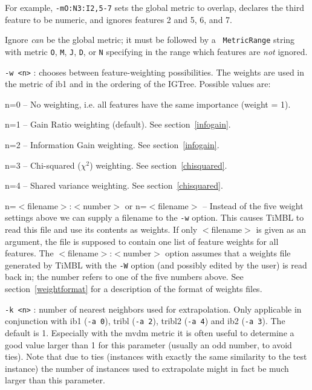 \documentclass{book}
\begin{document}
\begin{description}
For example, {\tt -mO:N3:I2,5-7} sets the global metric to overlap,
declares the third feature to be numeric, and ignores features 2 and
5, 6, and 7.

Ignore {\em can}\/ be the global metric; it must be followed by a {\tt
  MetricRange} string with metric {\tt O}, {\tt M}, {\tt J}, {\tt D},
or {\tt N} specifying in the range which features are {\em not}\/
ignored.

\item {\tt -w <n>} : chooses between feature-weighting possibilities.
The weights are used in the metric of {\sc ib1} and in the ordering of the
{\sc IGTree}. Possible values are:

	\begin{description}
	\item n=0 -- No weighting, i.e. all features have the same
	importance (weight = 1).
	\item n=1 -- Gain Ratio weighting (default). See section~\ref{infogain}.
	\item n=2 -- Information Gain weighting. See section~\ref{infogain}.
	\item n=3 -- Chi-squared ($\chi^2$) weighting. See section~\ref{chisquared}.
	\item n=4 -- Shared variance weighting. See section~\ref{chisquared}.
	\item n=$<$filename$>$:$<$number$>$ or n=$<$filename$>$ --
          Instead of the five weight settings above we can supply a
          filename to the {\tt -w} option. This causes TiMBL to read
          this file and use its contents as weights. If only
          $<$filename$>$ is given as an argument, the file is supposed
          to contain one list of feature weights for all features. The
          $<$filename$>$:$<$number$>$ option assumes that a weights
          file generated by TiMBL with the {\tt -W} option (and
          possibly edited by the user) is read back in; the number
          refers to one of the five numbers above. See
          section~\ref{weightformat} for a description of the format
          of weights files.
	\end{description}

\item {\tt -k <n>} : number of nearest neighbors used for
        extrapolation. Only applicable in conjunction with {\sc ib1}
        ({\tt -a 0}), {\sc tribl} ({\tt -a 2}), {\sc tribl2} ({\tt -a
          4}) and {\sc ib2} ({\tt -a 3}). The default is 1. Especially
        with the {\sc mvdm} metric it is often useful to determine a
        good value larger than 1 for this parameter (usually an odd
        number, to avoid ties). Note that due to ties (instances with
        exactly the same similarity to the test instance) the number
        of instances used to extrapolate might in fact be much larger
        than this parameter.


\end{description}
\end{document}
